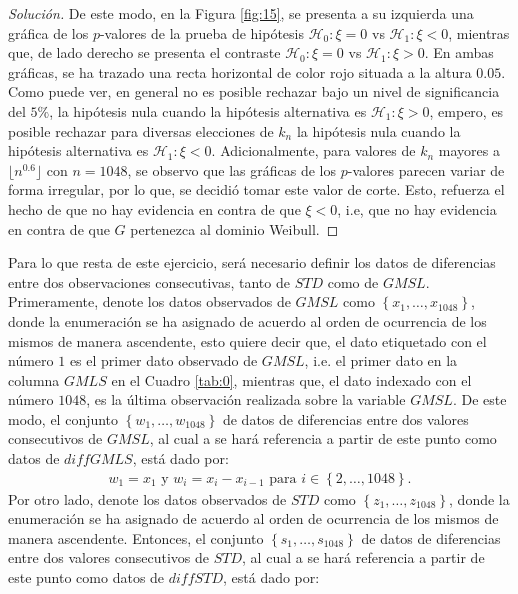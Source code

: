 \documentclass[10.5pt,notitlepage]{article}
\renewcommand{\qedsymbol}{$\blacksquare$}
\newenvironment{solucion}
  {\begin{proof}[Solución]}
  {\end{proof}}
\newcommand{\kis}[1]{\left\{ #1 \right\}}
\newcommand{\floor}[1]{\lfloor #1 \rfloor}
\theoremstyle{plain}
\newenvironment{rem}
  {\pushQED{\qed}\renewcommand{\qedsymbol}{$\triangle$}\remarkex}
  {\popQED\endremarkex}
\begin{document}
\begin{solucion}
\begin{rem}
De este modo, en la Figura \ref{fig:15}, se presenta a su izquierda una gráfica de los \(p\)-valores de la prueba de hipótesis \(\mathcal{H}_0: \xi = 0\) vs \(\mathcal{H}_1: \xi < 0\), mientras que, de lado derecho se presenta el contraste \(\mathcal{H}_0: \xi = 0\) vs \(\mathcal{H}_1: \xi > 0\). En ambas gráficas, se ha trazado una recta horizontal de color rojo situada a la altura \(0.05\). Como puede ver, en general no es posible rechazar bajo un nivel de significancia del \(5\%\), la hipótesis nula cuando la hipótesis alternativa es \(\mathcal{H}_1: \xi >0\), empero, es posible rechazar para diversas elecciones de \(k_{n}\) la hipótesis nula cuando la hipótesis alternativa es \(\mathcal{H}_1: \xi < 0\). Adicionalmente, para valores de \(k_{n}\) mayores a \(\floor{n^{0.6}}\) con \(n = 1048\), se observo que las gráficas de los \(p\)-valores parecen variar de forma irregular, por lo que, se decidió tomar este valor de corte. Esto, refuerza el hecho de que no hay evidencia en contra de que \(\xi <0\), i.e, que no hay evidencia en contra de que \(G\) pertenezca al dominio Weibull. 

\end{rem}
\end{solucion}
\newpage
Para lo que resta de este ejercicio, será necesario definir los datos de diferencias entre dos observaciones consecutivas, tanto de \(STD\) como de \(GMSL\). Primeramente, denote los datos observados de \(GMSL\) como \(\kis{x_1, \hdots, x_{1048}}\), donde la enumeración se ha asignado de acuerdo al orden de ocurrencia de los mismos de manera ascendente, esto quiere decir que, el dato etiquetado con el número \(1\) es el primer dato observado de \(GMSL\), i.e. el primer dato en la columna \(GMLS\) en el Cuadro \ref{tab:0}, mientras que, el dato indexado con el número \(1048\), es la última observación realizada sobre la variable \(GMSL\). De este modo, el conjunto \(\kis{w_1, \hdots,w_{1048}}\) de datos de diferencias entre dos valores consecutivos de \(GMSL\), al cual a se hará referencia a partir de este punto como datos de \(diffGMLS\), está dado por:
\begin{align*}
 w_1 = x_1 \text{ y } w_{i} = x_{i} -x_{i-1} \text{ para } i \in \kis{2, \hdots, 1048}.  
\end{align*}
Por otro lado, denote los datos observados de \(STD\) como \(\kis{z_1, \hdots, z_{1048}}\), donde la enumeración se ha asignado de acuerdo al orden de ocurrencia de los mismos de manera ascendente. Entonces, el conjunto \(\kis{s_1, \hdots,s_{1048}}\) de datos de diferencias entre dos valores consecutivos de \(STD\), al cual a se hará referencia a partir de este punto como datos de \(diffSTD\), está dado por:
\end{document}
